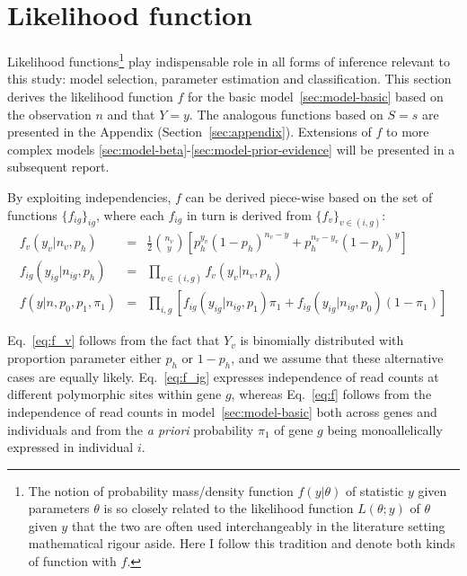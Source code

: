 \documentclass[letterpaper]{article}
\begin{document}
\renewcommand{\thesubsection}{\arabic{section}.\arabic{subsection}}
\section{Likelihood function}

Likelihood functions\footnote{The notion of probability mass/density function
\(f(y|\theta)\) of statistic \(y\) given parameters \(\theta\) is so closely
related to the likelihood function \(L(\theta; y)\) of \(\theta\) given \(y\)
that the two are often used interchangeably in the literature setting
mathematical rigour aside.  Here I follow this tradition and denote both kinds
of function with \(f\).  } play indispensable role in all forms of inference
relevant to this study: model selection, parameter estimation and
classification.  This section derives the likelihood function \(f\) for the
basic model~\ref{sec:model-basic} based on the observation \(n\) and that
\(Y=y\).  The analogous functions based on \(S=s\) are presented in the
Appendix (Section~\ref{sec:appendix}).  Extensions of \(f\) to more complex models
\ref{sec:model-beta}-\ref{sec:model-prior-evidence} will be presented
in a subsequent report.

By exploiting independencies, \(f\) can be derived piece-wise
based on the set of functions \(\{f_{ig}\}_{ig}\), where each \(f_{ig}\) in
turn is derived from \(\{f_v\}_{v\in(i,g)}\):
\begin{eqnarray}
\label{eq:f_v}
f_v(y_v | n_v, p_h) &=& \frac{1}{2} \binom{n_v}{y} \left[
p_h^{y_v} (1 - p_h)^{n_v - y} + 
p_h^{n_v - y_v} (1 - p_h)^y \right] \\
\label{eq:f_ig}
f_{ig}(y_{ig} | n_{ig}, p_h) &=& \prod_{v\in(i,g)} f_v(y_v | n_v, p_h) \\
\label{eq:f}
f(y | n, p_0, p_1, \pi_1) &=& \prod_{i,g} \left[
f_{ig}(y_{ig} | n_{ig}, p_1) \pi_1 +
f_{ig}(y_{ig} | n_{ig}, p_0) (1-\pi_1)
\right]
\end{eqnarray}

Eq.~\ref{eq:f_v} follows from the fact that \(Y_v\) is binomially distributed
with proportion parameter either \(p_h\) or \(1-p_h\), and we assume that
these alternative cases are equally likely.  Eq.~\ref{eq:f_ig} expresses
independence of read counts at different polymorphic sites within gene \(g\),
whereas Eq.~\ref{eq:f} follows from the independence of read counts in
model~\ref{sec:model-basic} both across genes and individuals and from the
\emph{a priori} probability \(\pi_1\) of gene \(g\) being monoallelically expressed
in individual \(i\).
\end{document}

